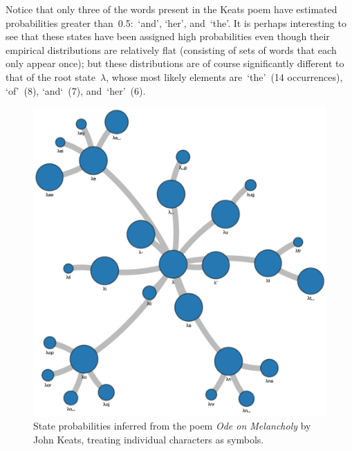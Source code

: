 \documentclass[12pt,a4paper]{article}
\begin{document}
Notice that only three of the words present in the Keats poem have estimated
probabilities greater than~0.5:~`and', `her', and~`the'. It is perhaps
interesting to see that these states have been assigned high probabilities even
though their empirical distributions are relatively flat (consisting of sets of
words that each only appear once); but these distributions are of course
significantly different to that of the root state~\(\lambda\), whose most likely
elements are~`the'~(14 occurrences), `of'~(8), `and`~(7), and~`her'~(6).
%

%
\begin{figure}[htbp]
  \includegraphics[width=\textwidth]{figures/text 1c}
\caption{State probabilities inferred from the poem \textit{Ode on Melancholy}
  by John Keats, treating individual characters as symbols.}
\label{fig:text 1c}
\end{figure}
%
\end{document}

